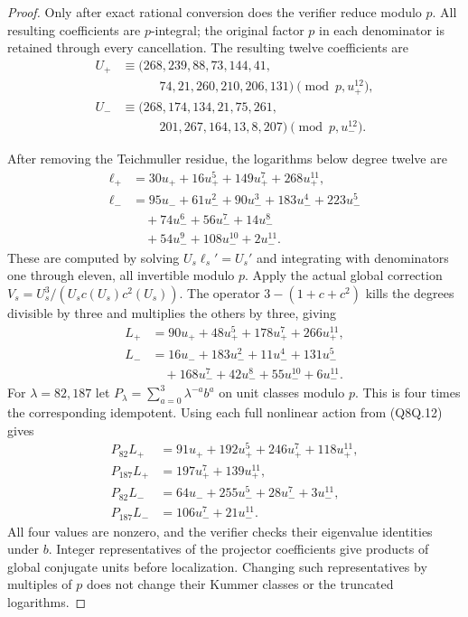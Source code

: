 \begin{proof}
Only after exact rational conversion does the verifier reduce
modulo $p$.  All resulting coefficients are $p$-integral;
the original factor $p$ in each denominator is retained through
every cancellation.
The resulting twelve coefficients are
\[
 \begin{aligned}
 U_+&\equiv(268,239,88,73,144,41,\\
    &\hspace{3em}74,21,260,210,206,131)\pmod{p,u_+^{12}},\\
 U_-&\equiv(268,174,134,21,75,261,\\
    &\hspace{3em}201,267,164,13,8,207)\pmod{p,u_-^{12}}.
 \end{aligned}
 \tag{Q8Q.14}
\]

After removing the Teichmuller residue, the logarithms below
degree twelve are
\[
 \begin{aligned}
 \ell_+&=30u_++16u_+^5+149u_+^7+268u_+^{11},\\
 \ell_-&=95u_-+61u_-^2+90u_-^3+183u_-^4+223u_-^5\\
       &\quad+74u_-^6+56u_-^7+14u_-^8\\
       &\quad+54u_-^9+108u_-^{10}+2u_-^{11}.
 \end{aligned}
 \tag{Q8Q.15}
\]
These are computed by solving $U_s\ell_s'=U_s'$ and integrating
with denominators one through eleven, all invertible modulo $p$.
Apply the actual global correction
$V_s=U_s^3/(U_sc(U_s)c^2(U_s))$.
The operator $3-(1+c+c^2)$ kills the degrees divisible by three
and multiplies the others by three, giving
\[
 \begin{aligned}
 L_+&=90u_++48u_+^5+178u_+^7+266u_+^{11},\\
 L_-&=16u_-+183u_-^2+11u_-^4+131u_-^5\\
    &\quad+168u_-^7+42u_-^8+55u_-^{10}+6u_-^{11}.
 \end{aligned}
 \tag{Q8Q.16}
\]
For $\lambda=82,187$ let
$P_\lambda=\sum_{a=0}^3\lambda^{-a}b^a$ on unit classes modulo $p$.
This is four times the corresponding idempotent.
Using each full nonlinear action from (Q8Q.12) gives
\[
 \begin{aligned}
 P_{82}L_+&=91u_++192u_+^5+246u_+^7+118u_+^{11},\\
 P_{187}L_+&=197u_+^7+139u_+^{11},\\
 P_{82}L_-&=64u_-+255u_-^5+28u_-^7+3u_-^{11},\\
 P_{187}L_-&=106u_-^7+21u_-^{11}.
 \end{aligned}
 \tag{Q8Q.17}
\]
All four values are nonzero, and the verifier checks their
eigenvalue identities under $b$.
Integer representatives of the projector coefficients give
products of global conjugate units before localization.
Changing such representatives by multiples of $p$ does not
change their Kummer classes or the truncated logarithms.


\end{proof}
